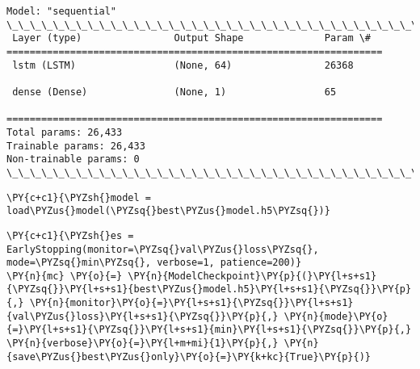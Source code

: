     \begin{Verbatim}[commandchars=\\\{\}]
Model: "sequential"
\_\_\_\_\_\_\_\_\_\_\_\_\_\_\_\_\_\_\_\_\_\_\_\_\_\_\_\_\_\_\_\_\_\_\_\_\_\_\_\_\_\_\_\_\_\_\_\_\_\_\_\_\_\_\_\_\_\_\_\_\_\_\_\_\_
 Layer (type)                Output Shape              Param \#
=================================================================
 lstm (LSTM)                 (None, 64)                26368

 dense (Dense)               (None, 1)                 65

=================================================================
Total params: 26,433
Trainable params: 26,433
Non-trainable params: 0
\_\_\_\_\_\_\_\_\_\_\_\_\_\_\_\_\_\_\_\_\_\_\_\_\_\_\_\_\_\_\_\_\_\_\_\_\_\_\_\_\_\_\_\_\_\_\_\_\_\_\_\_\_\_\_\_\_\_\_\_\_\_\_\_\_
    \end{Verbatim}

    \begin{tcolorbox}[breakable, size=fbox, boxrule=1pt, pad at break*=1mm,colback=cellbackground, colframe=cellborder]
\begin{Verbatim}[commandchars=\\\{\}]
\PY{c+c1}{\PYZsh{}model = load\PYZus{}model(\PYZsq{}best\PYZus{}model.h5\PYZsq{})}
\end{Verbatim}
\end{tcolorbox}

    \begin{tcolorbox}[breakable, size=fbox, boxrule=1pt, pad at break*=1mm,colback=cellbackground, colframe=cellborder]
\begin{Verbatim}[commandchars=\\\{\}]
\PY{c+c1}{\PYZsh{}es = EarlyStopping(monitor=\PYZsq{}val\PYZus{}loss\PYZsq{}, mode=\PYZsq{}min\PYZsq{}, verbose=1, patience=200)}
\PY{n}{mc} \PY{o}{=} \PY{n}{ModelCheckpoint}\PY{p}{(}\PY{l+s+s1}{\PYZsq{}}\PY{l+s+s1}{best\PYZus{}model.h5}\PY{l+s+s1}{\PYZsq{}}\PY{p}{,} \PY{n}{monitor}\PY{o}{=}\PY{l+s+s1}{\PYZsq{}}\PY{l+s+s1}{val\PYZus{}loss}\PY{l+s+s1}{\PYZsq{}}\PY{p}{,} \PY{n}{mode}\PY{o}{=}\PY{l+s+s1}{\PYZsq{}}\PY{l+s+s1}{min}\PY{l+s+s1}{\PYZsq{}}\PY{p}{,} \PY{n}{verbose}\PY{o}{=}\PY{l+m+mi}{1}\PY{p}{,} \PY{n}{save\PYZus{}best\PYZus{}only}\PY{o}{=}\PY{k+kc}{True}\PY{p}{)}
\end{Verbatim}
\end{tcolorbox}

